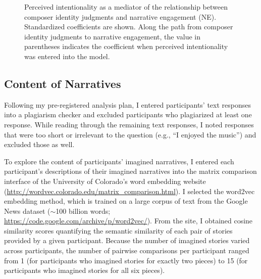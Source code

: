 \documentclass[12pt,twoside]{reedthesis}
\begin{document}
\begin{figure}[h!tbp]
	\centering
{}
  \caption{Perceived intentionality as a mediator of the relationship between composer identity judgments and narrative engagement (NE). Standardized coefficients are shown. Along the path from composer identity judgments to narrative engagement, the value in parentheses indicates the coefficient when perceived intentionality was entered into the model.
  }
  \label{fig-intentionality-ne}
\end{figure}

\subsection{Content of Narratives}

Following my pre-registered analysis plan, I entered participants’ text responses into a plagiarism checker and excluded participants who plagiarized at least one response. While reading through the remaining text responses, I noted responses that were too short or irrelevant to the question (e.g., “I enjoyed the music”) and excluded those as well.

To explore the content of participants’ imagined narratives, I entered each participant’s descriptions of their imagined narratives into the matrix comparison interface of the University of Colorado’s word embedding website (\url{http://wordvec.colorado.edu/matrix_comparison.html}). I selected the word2vec embedding method, which is trained on a large corpus of text from the Google News dataset ($\sim$100 billion words; \url{https://code.google.com/archive/p/word2vec/}). From the site, I obtained cosine similarity scores quantifying the semantic similarity of each pair of stories provided by a given participant. Because the number of imagined stories varied across participants, the number of pairwise comparisons per participant ranged from 1 (for participants who imagined stories for exactly two pieces) to 15 (for participants who imagined stories for all six pieces).
\end{document}
